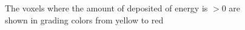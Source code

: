 \documentclass[11pt,a4paper]{report}
\begin{document}
	\begin{center}
\begin{figure}
	\centering
	\hfill
\hfill
	\caption{The voxels where the amount of deposited of energy is $>0$ are shown in grading colors from yellow to red}
\hfill
\end{figure}
    \end{center}
\end{document}
